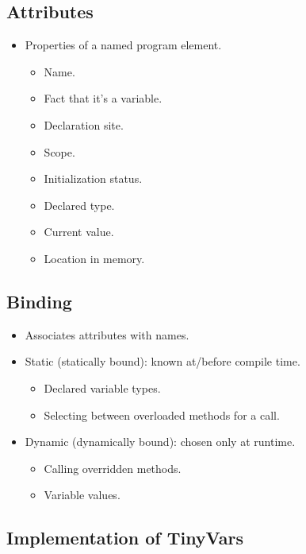\documentclass{article}
\begin{document}
\subsection{Attributes}

\begin{itemize}
    \item Properties of a named program element.
    \begin{itemize}
        \item Name.
        \item Fact that it's a variable.
        \item Declaration site.
        \item Scope.
        \item Initialization status.
        \item Declared type.
        \item Current value.
        \item Location in memory.
    \end{itemize}
\end{itemize}

\subsection{Binding}

\begin{itemize}
    \item Associates attributes with names.
    \item Static (statically bound): known at/before compile time.
    \begin{itemize}
        \item Declared variable types.
        \item Selecting between overloaded methods for a call.
    \end{itemize}
    \item Dynamic (dynamically bound): chosen only at runtime.
    \begin{itemize}
        \item Calling overridden methods.
        \item Variable values.
    \end{itemize}
\end{itemize}

\subsection{Implementation of TinyVars}
\end{document}
